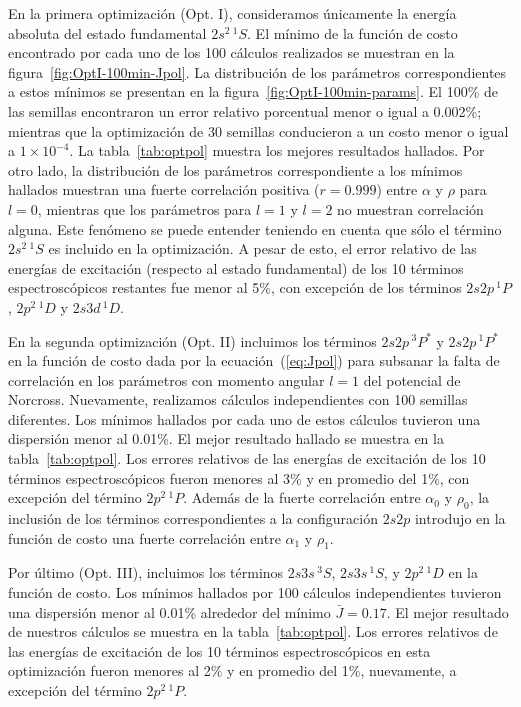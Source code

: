 En la primera optimización (Opt. I), consideramos únicamente la energía
absoluta del estado fundamental $2s^2\,^1S$. El mínimo de la función 
de costo encontrado por cada uno de los 100 cálculos realizados se 
muestran en la figura~\ref{fig:OptI-100min-Jpol}. La distribución de los 
parámetros correspondientes a estos mínimos se presentan en la 
figura~\ref{fig:OptI-100min-params}. El 100\% de las semillas encontraron 
un error relativo porcentual menor o igual a 0.002\%; mientras que la 
optimización de 30 semillas conducieron a un costo menor o igual a 
$1\times 10^{-4}$. La tabla~\ref{tab:optpol} muestra los mejores 
resultados hallados. Por otro lado, la distribución de los parámetros 
correspondiente a los mínimos hallados muestran una fuerte correlación 
positiva ($r=0.999$) entre $\alpha $ y $\rho$ para $l=0$, mientras que 
los parámetros para $l=1$ y $l=2$ no muestran correlación alguna. Este 
fenómeno se puede entender teniendo en cuenta que sólo el término 
$2s^2\,^1S$ es incluido en la optimización. A pesar de esto, el error 
relativo de las energías de excitación (respecto al estado fundamental) 
de los 10 términos espectroscópicos restantes fue menor al 5\%, con 
excepción de los términos $2s2p\,^1P$, $2p^2\,^1D$ y $2s3d\,^1D$.

En la segunda optimización (Opt. II) incluimos los términos $2s2p\,^3P^*$ 
y $2s2p\,^1P^*$ en la función de costo dada por la ecuación~(\ref{eq:Jpol}) 
para subsanar la falta de correlación en los parámetros con momento 
angular $l=1$ del potencial de Norcross. Nuevamente, realizamos cálculos 
independientes con 100 semillas diferentes. Los mínimos hallados por cada 
uno de estos cálculos tuvieron una dispersión menor al 0.01\%. El mejor 
resultado hallado se muestra en la tabla~\ref{tab:optpol}. Los errores 
relativos de las energías de excitación de los 10 términos 
espectroscópicos fueron menores al 3\% y en promedio del 1\%, con 
excepción del término $2p^2\,^1P$. Además de la fuerte correlación entre 
$\alpha_0$ y $\rho_0$, la inclusión de los términos correspondientes a la 
configuración $2s2p$ introdujo en la función de costo una fuerte 
correlación entre $\alpha_1$ y $\rho_1$.

Por último (Opt. III), incluimos los términos $2s3s\,^3S$, $2s3s\,^1S$, y 
$2p^2\,^1D$ en la función de costo. Los mínimos hallados por 100 cálculos 
independientes tuvieron una dispersión menor al 0.01\% alrededor del 
mínimo $\bar{J}=0.17$. El mejor resultado de nuestros cálculos se muestra 
en la tabla~\ref{tab:optpol}. Los errores relativos de las energías de 
excitación de los 10 términos espectroscópicos en esta optimización 
fueron menores al 2\% y en promedio del 1\%, nuevamente, a excepción del 
término $2p^2\,^1P$.

